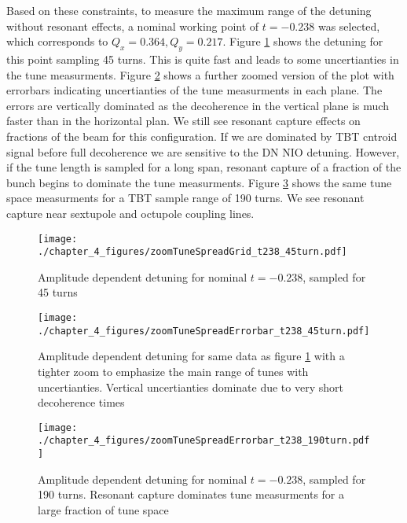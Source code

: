 Based on these constraints, to measure the maximum range of the detuning without resonant effects, a nominal working point of $t=-0.238$ was selected, which corresponds to $Q_x = 0.364, Q_y = 0.217$. Figure \ref{fig:t238detune45} shows the detuning for this point sampling 45 turns. This is quite fast and leads to some uncertianties in the tune measurments. Figure \ref{fig:t238detune45Error} shows a further zoomed version of the plot with errorbars indicating uncertianties of the tune measurments in each plane. The errors are vertically dominated as the decoherence in the vertical plane is much faster than in the horizontal plan. We still see resonant capture effects on fractions of the beam for this configuration. If we are dominated by TBT cntroid signal before full decoherence we are sensitive to the DN NIO detuning. However, if the tune length is sampled for a long span, resonant capture of a fraction of the bunch begins to dominate the tune measurments. Figure \ref{fig:t238detune190} shows the same tune space measurments for a TBT sample range of 190 turns. We see resonant capture near sextupole and octupole coupling lines.

\begin{figure}
	\centering
	\texttt{[image: ./chapter\_4\_figures/zoomTuneSpreadGrid\_t238\_45turn.pdf]}
	\caption{Amplitude dependent detuning for nominal $t=-0.238$, sampled for 45 turns}
	\label{fig:t238detune45}
\end{figure}


\begin{figure}
	\centering
	\texttt{[image: ./chapter\_4\_figures/zoomTuneSpreadErrorbar\_t238\_45turn.pdf]}
	\caption{Amplitude dependent detuning for same data as figure \ref{fig:t238detune45} with a tighter zoom to emphasize the main range of tunes with uncertianties. Vertical uncertianties dominate due to very short decoherence times}
	\label{fig:t238detune45Error}
\end{figure}

\begin{figure}
	\centering
	\texttt{[image: ./chapter\_4\_figures/zoomTuneSpreadErrorbar\_t238\_190turn.pdf]}
	\caption{Amplitude dependent detuning for nominal $t=-0.238$, sampled for 190 turns. Resonant capture dominates tune measurments for a large fraction of tune space}
	\label{fig:t238detune190}
\end{figure}


